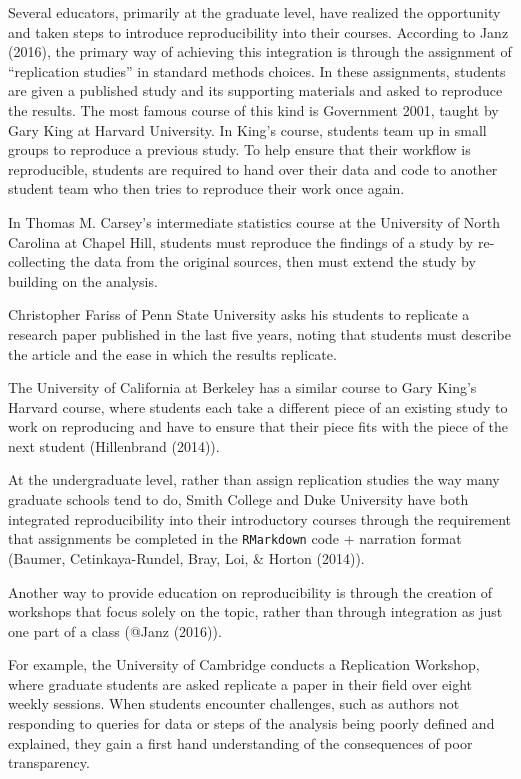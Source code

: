 \documentclass[12pt,twoside]{reedthesis}
\begin{document}
Several educators, primarily at the graduate level, have realized the opportunity and taken steps to introduce reproducibility into their courses.
According to Janz (2016), the primary way of achieving this integration is through the assignment of ``replication studies'' in standard methods choices. In these assignments, students are given a published study and its supporting materials and asked to reproduce the results. The most famous course of this kind is Government 2001, taught by Gary King at Harvard University. In King's course, students team up in small groups to reproduce a previous study. To help ensure that their workflow is reproducible, students are required to hand over their data and code to another student team who then tries to reproduce their work once again.

In Thomas M. Carsey's intermediate statistics course at the University of North Carolina at Chapel Hill, students must reproduce the findings of a study by re-collecting the data from the original sources, then must extend the study by building on the analysis.

Christopher Fariss of Penn State University asks his students to replicate a research paper published in the last five years, noting that students must describe the article and the ease in which the results replicate.

The University of California at Berkeley has a similar course to Gary King's Harvard course, where students each take a different piece of an existing study to work on reproducing and have to ensure that their piece fits with the piece of the next student (Hillenbrand (2014)).

At the undergraduate level, rather than assign replication studies the way many graduate schools tend to do, Smith College and Duke University have both integrated reproducibility into their introductory courses through the requirement that assignments be completed in the \texttt{RMarkdown} code + narration format (Baumer, Cetinkaya-Rundel, Bray, Loi, \& Horton (2014)).

Another way to provide education on reproducibility is through the creation of workshops that focus solely on the topic, rather than through integration as just one part of a class (@Janz (2016)).

For example, the University of Cambridge conducts a Replication Workshop, where graduate students are asked replicate a paper in their field over eight weekly sessions. When students encounter challenges, such as authors not responding to queries for data or steps of the analysis being poorly defined and explained, they gain a first hand understanding of the consequences of poor transparency.
\end{document}
